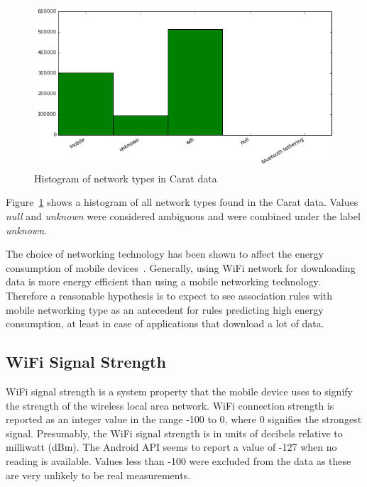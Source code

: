 \begin{figure} %
	\centering
	\includegraphics[width=\textwidth]{images/carat-data/network_type.png}
	\caption{Histogram of network types in Carat data}
	\label{figure:carat-data-net-type}
\end{figure}   

Figure~\ref{figure:carat-data-net-type} shows a histogram of all network types found in the Carat data. Values \textit{null} and \textit{unknown} were considered ambiguous and were combined under the label \textit{unknown}.
 
The choice of networking technology has been shown to affect the energy consumption of mobile devices~\cite{7146507, 6240745}. Generally, using WiFi network for downloading data is more energy efficient than using a mobile networking technology. Therefore a reasonable hypothesis is to expect to see association rules with mobile networking type as an antecedent for rules predicting high energy consumption, at least in case of applications that download a lot of data.  

\subsection{WiFi Signal Strength}

WiFi signal strength is a system property that the mobile device uses to signify the strength of the wireless local area network. WiFi connection strength is reported as an integer value in the range -100 to 0, where 0 signifies the strongest signal. Presumably, the WiFi signal strength is in units of decibels relative to milliwatt (dBm). The Android API seems to report a value of -127 when no reading is available. Values less than -100 were excluded from the data as these are very unlikely to be real measurements.

